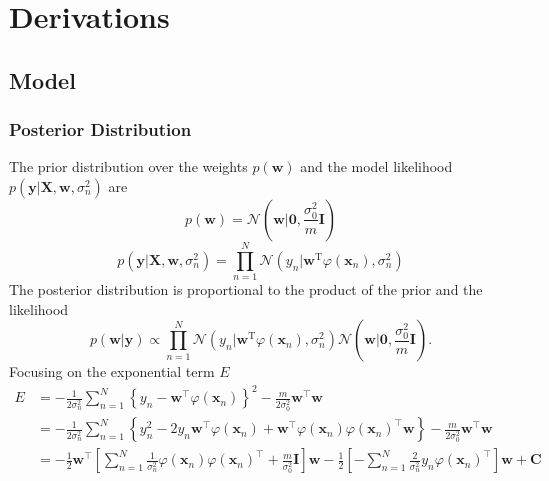\chapter{Derivations} 

\section{Model}
\subsection{Posterior Distribution}
\label{A:derivation-posterior-over-weights}
The prior distribution over the weights $p(\mathbf{w})$ and the model likelihood $p(\mathbf{y} | \mathbf{X}, \mathbf{w}, \sigma_{n}^{2})$ are 
\begin{equation}
    p\left(\mathbf{w}\right)= \mathcal{N}\left(\mathbf{w} | \mathbf{0}, \frac{\sigma_{0}^{2}}{m}\mathbf{I}\right)
\end{equation}
\begin{equation}
    p\left(\mathbf{y} | \mathbf{X}, \mathbf{w}, \sigma_{n}^{2}\right)=\prod_{n=1}^{N} \mathcal{N}\left(y_{n} | \mathbf{w}^{\mathrm{T}} \varphi\left(\mathbf{x}_{n}\right), \sigma_{n}^{2}\right)
\end{equation}
The posterior distribution is proportional to the product of the prior and the likelihood
\begin{equation}
    p(\mathbf{w} | \mathbf{y}) \propto \prod_{n=1}^{N} \mathcal{N}\left(y_{n} | \mathbf{w}^{\mathrm{T}} \varphi\left(\mathbf{x}_{n}\right), \sigma_{n}^{2}\right) \mathcal{N}\left(\mathbf{w} | \mathbf{0}, \frac{\sigma_{0}^{2}}{m}\mathbf{I}\right).
\end{equation}
Focusing on the exponential term $E$
\begin{equation}
    \begin{aligned}  E 
    &=-\frac{1}{2\sigma_{n}^{2}} \sum_{n=1}^{N}\left\{y_{n}-\mathbf{w}^{\top} \varphi\left(\mathbf{x}_{n}\right)\right\}^{2}-\frac{m}{2\sigma_{0}^2}\mathbf{w}^{\top} \mathbf{w} \\ 
    &=-\frac{1}{2\sigma_{n}^{2}} \sum_{n=1}^{N}\left\{y_{n}^{2}-2 y_{n} \mathbf{w}^{\top} \varphi\left(\mathbf{x}_{n}\right)+\mathbf{w}^{\top} \varphi\left(\mathbf{x}_{n}\right) \varphi\left(\mathbf{x}_{n}\right)^{\top} \mathbf{w}\right\}-\frac{m}{2\sigma_{0}^2}\mathbf{w}^{\top} \mathbf{w} \\ 
    &= -\frac{1}{2} \mathbf{w}^{\top}\left[\sum_{n=1}^{N} \frac{1}{\sigma_{n}^{2}} \varphi\left(\mathbf{x}_{n}\right) \varphi\left(\mathbf{x}_{n}\right)^{\top} + \frac{m}{\sigma_{0}^2}\mathbf{I}\right] \mathbf{w} -\frac{1}{2}\left[-\sum_{n=1}^{N}  \frac{2}{\sigma_{n}^{2}} y_{n} \varphi\left(\mathbf{x}_{n}\right)^{\top}\right] \mathbf{w} + \mathbf{C}
    \end{aligned}
    \label{A-posterior-complete-square}
\end{equation}
